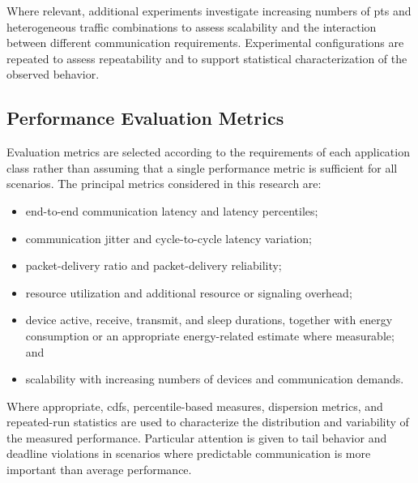 \documentclass[12pt,a4paper]{article}
\begin{document}
Where relevant, additional experiments investigate increasing numbers of
\glspl{pt} and heterogeneous traffic combinations to assess scalability and
the interaction between different communication requirements. Experimental
configurations are repeated to assess repeatability and to support statistical
characterization of the observed behavior.


\subsection{Performance Evaluation Metrics}
\label{subsec:performance_metrics}

Evaluation metrics are selected according to the requirements of each
application class rather than assuming that a single performance metric is
sufficient for all scenarios. The principal metrics considered in this
research are:

\begin{itemize}

\item end-to-end communication latency and latency percentiles;

\item communication jitter and cycle-to-cycle latency variation;

\item packet-delivery ratio and packet-delivery reliability;

\item resource utilization and additional resource or signaling overhead;

\item device active, receive, transmit, and sleep durations, together with
      energy consumption or an appropriate energy-related estimate where
      measurable; and

\item scalability with increasing numbers of devices and communication demands.

\end{itemize}

Where appropriate, \glspl{cdf}, percentile-based measures, dispersion metrics,
and repeated-run statistics are used to characterize the distribution and
variability of the measured performance. Particular attention is given to
tail behavior and deadline violations in scenarios where predictable
communication is more important than average performance.
\end{document}
